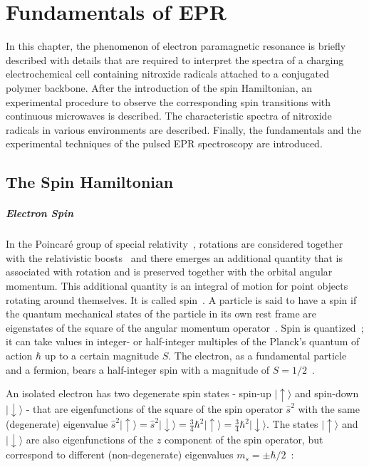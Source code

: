 \chapter{Fundamentals of EPR}
\label{ch:epr}

In this chapter, the phenomenon of electron paramagnetic resonance is briefly described with details that are required to interpret the spectra of a charging electrochemical cell containing nitroxide radicals attached to a conjugated polymer backbone. After the introduction of the spin Hamiltonian, an experimental procedure to observe the corresponding spin transitions with continuous microwaves is described. The characteristic spectra of nitroxide radicals in various environments are described. Finally, the fundamentals and the experimental techniques of the pulsed EPR spectroscopy are introduced.

\section{The Spin Hamiltonian}
\label{sec:spin}
\paragraph*{Electron Spin}
In the Poincaré group of special relativity~\cite{poincare_1905}, rotations are considered together with the relativistic boosts~\cite{einstein_s_rel} and there emerges an additional quantity that is associated with rotation and is preserved together with the orbital angular momentum. This additional quantity is an integral of motion for point objects rotating around themselves. It is called spin~\cite{kuprov_2023}. A particle is said to have a spin if the quantum mechanical states of the particle in its own rest frame are eigenstates of the square of the angular momentum operator~\cite{Tung_book}. Spin is quantized~\cite{SternGerlach1922}; it can take values in integer- or half-integer multiples of the Planck's quantum of action $\hbar$ up to a certain magnitude $S$. The electron, as a fundamental particle and a fermion, bears a half-integer spin with a magnitude of $S=1/2$~\cite{SternGerlach1922,Sakurai}. 

\par
An isolated electron has two degenerate spin states - spin-up $\vert{\uparrow}\rangle$ and spin-down $\vert{\downarrow}\rangle$ - that are eigenfunctions of the square of the spin operator $\hat{s}^2$ with the same (degenerate) eigenvalue $\hat{s}^2\vert{\uparrow}\rangle=\hat{s}^2\vert{\downarrow}\rangle=\frac{3}{4}\hbar^2\vert{\uparrow}\rangle=\frac{3}{4}\hbar^2\vert{\downarrow}\rangle$. The states $\vert{\uparrow}\rangle$ and $\vert{\downarrow}\rangle$ are also eigenfunctions of the $z$ component of the spin operator, but correspond to different (non-degenerate) eigenvalues $m_s=\pm\hbar/2$~\cite{Sakurai}: 

